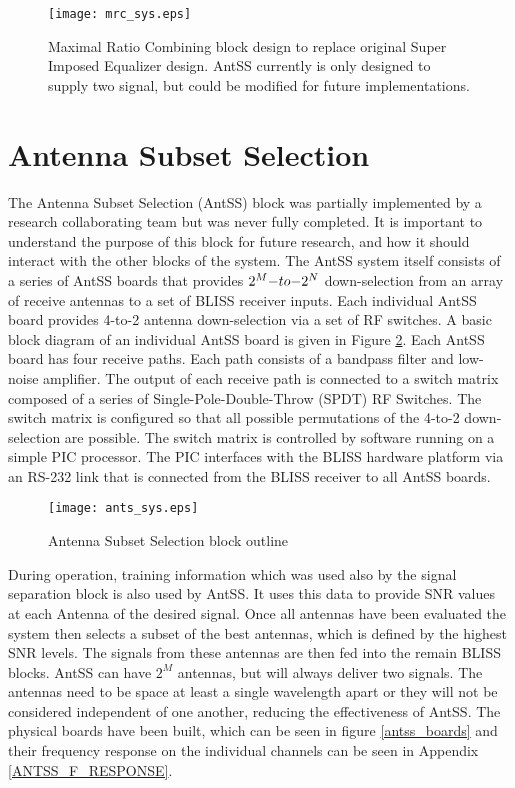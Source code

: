 \begin{figure}[!ht]\label{mrc_sys_ss}
\centering
\texttt{[image: mrc\_sys.eps]}
\caption{Maximal Ratio Combining block design to replace original Super Imposed Equalizer design.  AntSS currently is only designed to supply two signal, but could be modified for future implementations.}
\end{figure}

\section{Antenna Subset Selection}

The Antenna Subset Selection (AntSS) block was partially implemented by a research collaborating team but was never fully completed.  It is important to understand the purpose of this block for future research, and how it should interact with the other blocks of the system.  The AntSS system itself consists of a series of AntSS boards that provides \(2^{M}$$ -to-$$2^{N}\) down-selection from an array of receive antennas to a set of BLISS receiver inputs. Each individual AntSS board provides 4-to-2 antenna down-selection via a set of RF switches. A basic block diagram of an individual AntSS board is given in Figure \ref{ants_sys}.  Each AntSS board has four receive paths. Each path consists of a bandpass filter and low-noise amplifier. The output of each receive path is connected to a switch matrix composed of a series of Single-Pole-Double-Throw (SPDT) RF Switches. The switch matrix is configured so that all possible permutations of the 4-to-2 down-selection are possible. The switch matrix is controlled by software running on a simple PIC processor. The PIC interfaces with the BLISS hardware platform via an RS-232 link that is connected from the BLISS receiver to all AntSS boards.\\

\begin{figure}[!ht]\label{ants_sys}
\centering
\texttt{[image: ants\_sys.eps]}
\caption{Antenna Subset Selection block outline}
\end{figure}

During operation, training information which was used also by the signal separation block is also used by AntSS.  It uses this data to provide SNR values at each Antenna of the desired signal.  Once all antennas have been evaluated the system then selects a subset of the best antennas, which is defined by the highest SNR levels.  The signals from these antennas are then fed into the remain BLISS blocks.  AntSS can have \(2^{M}\) antennas, but will always deliver two signals.  The antennas need to be space at least a single wavelength apart or they will not be considered independent of one another, reducing the effectiveness of AntSS.  The physical boards have been built, which can be seen in figure \ref{antss_boards} and their frequency response on the individual channels can be seen in Appendix \ref{ANTSS_F_RESPONSE}.\\

